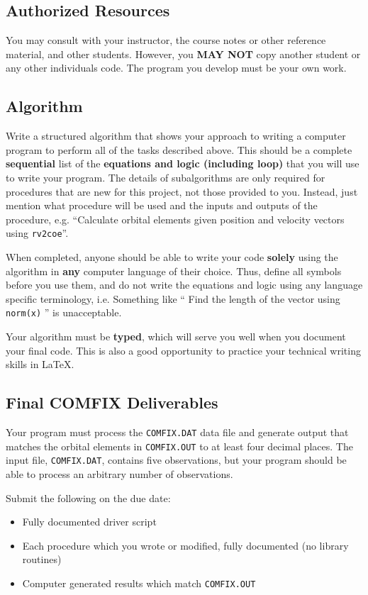 \documentclass[11pt, reqno]{article}    %
\begin{document}
\subsection*{Authorized Resources}
You may consult with your instructor, the course notes or other reference material, and other students. 
However, you \textbf{MAY NOT} copy another student or any other individuals code. 
The program you develop must be your own work.

\subsection*{Algorithm}

Write a structured algorithm that shows your approach to writing a computer program to perform all of the tasks described above.
This should be a complete \textbf{sequential} list of the \textbf{equations and logic (including loop)} that you will use to write your program.
The details of subalgorithms are only required for procedures that are new for this project, not those provided to you.
Instead, just mention what procedure will be used and the inputs and outputs of the procedure, e.g. ``Calculate orbital elements given position and velocity vectors using \texttt{rv2coe}''.

When completed, anyone should be able to write your code \textbf{solely} using the algorithm in \textbf{any} computer language of their choice.
Thus, define all symbols before you use them, and do not write the equations and logic using any language specific terminology, i.e. Something like `` Find the length of the vector using \texttt{norm(x)} '' is unacceptable.

Your algorithm must be \textbf{typed}, which will serve you well when you document your final code. 
This is also a good opportunity to practice your technical writing skills in \LaTeX.

\subsection*{Final COMFIX Deliverables}

Your program must process the \texttt{COMFIX.DAT} data file and generate output that matches the orbital elements in \texttt{COMFIX.OUT} to at least four decimal places. 
The input file, \texttt{COMFIX.DAT}, contains five observations, but your program should be able to process an arbitrary number of observations.

Submit the following on the due date:
\begin{itemize}
    \item Fully documented driver script
    \item Each procedure which you wrote or modified, fully documented (no library routines)
    \item Computer generated results which match \texttt{COMFIX.OUT}
\end{itemize}
\end{document}
